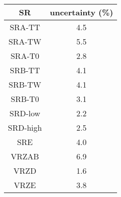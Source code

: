 \begin{tabular}{c||c} \hline\hline
{\bf SR} & {\bf uncertainty (\%)} \\ \hline
SRA-TT & 4.5\\ \hline
SRA-TW & 5.5\\ \hline
SRA-T0 & 2.8\\ \hline
SRB-TT & 4.1\\ \hline
SRB-TW & 4.1\\ \hline
SRB-T0 & 3.1\\ \hline
SRD-low & 2.2\\ \hline
SRD-high & 2.5\\ \hline
SRE & 4.0\\ \hline
VRZAB & 6.9\\ \hline
VRZD & 1.6\\ \hline
VRZE & 3.8\\ \hline
\hline
\end{tabular}
